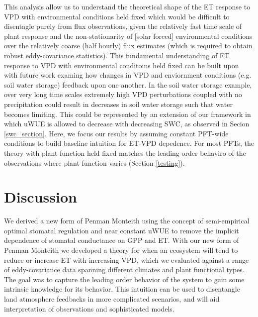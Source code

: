 \documentclass[draft,linenumbers]{agujournal}
\begin{document}
This analysis allow us to understand the theoretical shape of the ET
response to VPD with environmental conditions held fixed which would
be difficult to disentagle purely from flux observations, given the
relatively fast time scale of plant response and the non-stationarity
of [solar forced] environmental conditions  over the relatively
coarse (half hourly) flux estimates (which is required to obtain
robust eddy-covariance statistics). This fundamental understanding of
ET response to VPD with environmental conditoins held fixed can be
built upon with future work examing how changes in VPD and enviornment
conditions (e.g. soil water storage) feedback upon one another. In the
soil water storage example, over very long time scales extremely high
VPD perturbations coupled with no precipitation could result in
decreases in soil water storage such that water becomes limiting. This
could be represented by an extension of our framework in which uWUE is
allowed to decrease with decreasing SWC, as observed in Secion
\ref{swc_section}. Here, we focus our results by assuming constant
PFT-wide conditions to build baseline intuition for ET-VPD
depedence. For most PFTs, the theory with plant function held fixed
matches the leading order behaviro of the observations where plant
function varies (Section \ref{testing}).

\section{Discussion}

We derived a new form of Penman Monteith using the concept of
semi-empirical optimal stomatal regulation \citep{Lin_2015,
  MEDLYN_2011} and near constant uWUE \citep{Zhou_2015} to remove the
implicit dependence of stomatal conductance on GPP and ET. With our
new form of Penman Monteith we developed a theory for when an
ecosystem will tend to reduce or increase ET with increasing VPD,
which we evaluated against a range of eddy-covariance data spanning
different climates and plant functional types. The goal was to capture
the leading order behavior of the system to gain some intrinsic
knowledge for its behavior. This intuition can be used to disentangle
land atmosphere feedbacks in more complicated scenarios, and will aid
interpretation of observations and sophisticated models.
\end{document}
